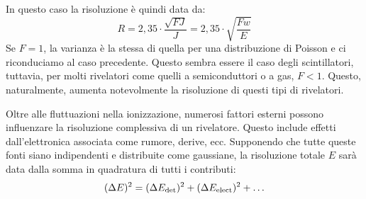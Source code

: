 In questo caso la risoluzione è quindi data da:
\begin{equation*}
   R
   =2,35 \cdot \frac{\sqrt{FJ}}{J}
   =2,35 \cdot \sqrt{\frac{Fw}{E}}
\end{equation*}
Se $F=1$, la varianza è la stessa di quella per una distribuzione di Poisson e ci riconduciamo al caso precedente. Questo sembra essere il caso degli scintillatori, tuttavia, per molti rivelatori come quelli a semiconduttori o a gas, $F<1$. Questo, naturalmente, aumenta notevolmente la risoluzione di questi tipi di rivelatori.

\vspace{0.2cm}Oltre alle fluttuazioni nella ionizzazione, numerosi fattori esterni possono influenzare la risoluzione complessiva di un rivelatore. Questo include effetti dall'elettronica associata come rumore, derive, ecc. Supponendo che tutte queste fonti siano indipendenti e distribuite come gaussiane, la risoluzione totale $E$ sarà data dalla somma in quadratura di tutti i contributi:
\begin{equation*}
   (\Delta E)^2
   =(\Delta E_{\rm det})^2 + (\Delta E_{\rm elect})^2 + \ldots
\end{equation*}


